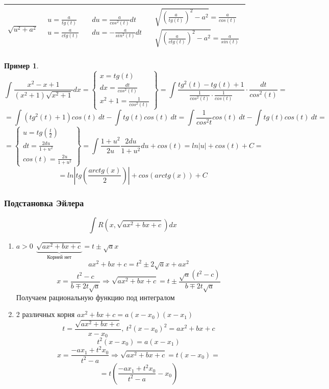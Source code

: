 \documentclass[a4paper]{article}
\theoremstyle{definition}
\newtheorem*{exmp}{Пример}
\numberwithin{theorem}{subsection}
\numberwithin{lemma}{subsection}
\numberwithin{definition}{subsection}
\numberwithin{comment*}{subsection}
\numberwithin{consequence}{subsection}
\numberwithin{property}{subsection}
\begin{document}
\begin{center}
\begin{tabular}{ |c|c|c|c| }
  \hline
  $\sqrt{u^2+a^2}$ & $\begin{aligned}
    u = \frac{a}{tg(t)}  \\
    u = \frac{a}{ctg(t)} \\
   \end{aligned}$ & $\begin{aligned}
    du = \frac{a}{cos^2 (t)} dt  \\
    du = -\frac{a}{sin^2 (t)} dt \\
   \end{aligned}$ & $\begin{aligned}
    \sqrt{(\frac{a}{tg(t)})^2 - a^2}=\frac{a}{cos(t)}  \\
    \sqrt{(\frac{a}{ctg(t)})^2 - a^2}=\frac{a}{sin(t)} \\
   \end{aligned}$ \\
  \hline
 \end{tabular}
\end{center}
\begin{exmp}
 $$ \int \frac{x^2-x+1}{(x^2+1)\sqrt{x^2+1}} dx= \left\{\!\begin{aligned}
   x = tg(t)                 \\
   dx = \frac{dt}{cos^2 (t)} \\
   x^2+1 = \frac{1}{cos^2 (t)}
  \end{aligned} \right\} = \int \frac{tg^2 (t) - tg (t) + 1}{\frac{1}{cos^2 (t)}\cdot \frac{1}{cos(t)}} \cdot \frac{dt}{cos^2 (t)} =$$
 $$ = \int (tg^2(t)+1)cos(t)\ dt - \int tg(t)cos(t)\ dt= \int \frac{1}{cos^2t}cos(t)\ dt - \int tg(t)cos(t)\ dt = $$
 $$=\left\{\!\begin{aligned}
   u = tg(\frac{t}{2})    \\
   dt = \frac{2du}{1+u^2} \\
   cos(t) = \frac{2u}{1+u^2}
  \end{aligned} \right\} = \int \frac{1+u^2}{2u} \frac{2du}{1+u^2} du + cos(t) = ln|u|+cos(t) + C=$$
 $$=ln|tg(\frac{arctg(x)}{2})| + cos(arctg(x)) + C$$
\end{exmp}
\subsubsection{Подстановка Эйлера}
$$ \int R(x, \sqrt{ax^2+bx+c}) dx $$
\begin{enumerate}
 \item $a>0\ \ \underbrace{\sqrt{ax^2+bx+c}}_{\text{Корней нет}}=t \pm \sqrt{a}x$
       $$ ax^2 + bx+ c = t^2 \pm 2\sqrt{a}x + ax^2$$
       $$ x = \frac{t^2-c}{b \mp 2t \sqrt{a}} \Rightarrow \sqrt{ax^2+bx+c}=t \pm \frac{\sqrt{a}(t^2-c)}{b\mp2t \sqrt{a}}$$
       Получаем рациональную функцию под интегралом
 \item 2 различных корня $ax^2+bx+c=a(x-x_0)(x-x_1)$
       $$ t = \frac{ \sqrt{ax^2+bx+c}}{x-x_0},\ t^2 (x-x_0)^2 = ax^2+bx+c$$
       $$ t^2(x-x_0) = a(x-x_1)$$
       $$ x = \frac{-ax_1 + t^2 x_0}{t^2 - a} \Rightarrow \sqrt{ax^2+bx+c} = t(x-x_0)=$$
       $$ = t(\frac{-ax_1 + t^2 x_0}{t^2 - a} - x_0)$$
\end{enumerate}
\end{document}
